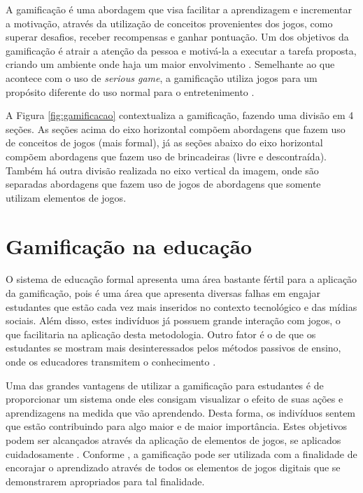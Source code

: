 \documentclass[
	12pt,				%
	oneside,			%
	a4paper,			%
	english,			%
	french,				%
	spanish,			%
	brazil,				%
	]{abntex2}
\begin{document}
A gamificação é uma abordagem que visa facilitar a aprendizagem e incrementar a motivação, através da utilização de conceitos provenientes dos jogos, como superar desafios, receber recompensas e ganhar pontuação. Um dos objetivos da gamificação é atrair a atenção da pessoa e motivá-la a executar a tarefa proposta, criando um ambiente onde haja um maior envolvimento \cite{kaap:2014}. Semelhante ao que acontece com o uso de \textit{serious game}, a gamificação utiliza jogos para um propósito diferente do uso normal para o entretenimento \cite{deterding2011game}.

A Figura \ref{fig:gamificacao} contextualiza a gamificação, fazendo uma divisão em 4 seções. As seções acima do eixo horizontal compõem abordagens que fazem uso de conceitos de jogos (mais formal), já as seções abaixo do eixo horizontal compõem abordagens que fazem uso de brincadeiras (livre e descontraída). Também há outra divisão realizada no eixo vertical da imagem, onde são separadas abordagens que fazem uso de jogos  de abordagens que somente utilizam elementos de jogos.

\section{Gamificação na educação}

O sistema de educação formal apresenta uma área bastante fértil para a aplicação da gamificação, pois é uma área que apresenta diversas falhas em engajar estudantes que estão cada vez mais inseridos no contexto tecnológico e das mídias sociais. Além disso, estes indivíduos já possuem grande interação com jogos, o que facilitaria na aplicação desta metodologia. Outro fator é o de que os estudantes se mostram mais desinteressados pelos métodos passivos de ensino, onde os educadores transmitem o conhecimento \cite{fardo2013gamificaccao}. 

Uma das grandes vantagens de utilizar a gamificação para estudantes é de proporcionar um sistema onde eles consigam visualizar o efeito de suas ações e aprendizagens na medida que vão aprendendo. Desta forma, os indivíduos sentem que estão contribuindo para algo maior e de maior importância. Estes objetivos podem ser alcançados através da aplicação de elementos de jogos, se aplicados cuidadosamente \cite{fardo2013gamificaccao}. Conforme \citet{kaap:2014}, a gamificação pode ser utilizada com a finalidade de encorajar o aprendizado através de todos os elementos de jogos digitais que se demonstrarem apropriados para tal finalidade.  
\end{document}
